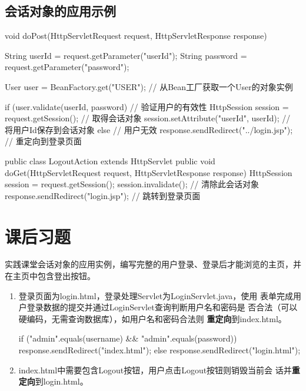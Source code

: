 \subsection{会话对象的应用示例} 


\begin{javaCode}
  void doPost(HttpServletRequest request, HttpServletResponse response) {
    String userId = request.getParameter("userId");
    String password = request.getParameter("password");

    User user = BeanFactory.get("USER"); // 从Bean工厂获取一个User的对象实例
    
    if (user.validate(userId, password) { // 验证用户的有效性
      HttpSession session = request.getSession();  // 取得会话对象
      session.setAttribute("userId", userId);  // 将用户Id保存到会话对象
    } else { // 用户无效
      response.sendRedirect("../login.jsp"); // 重定向到登录页面
    }
  }
\end{javaCode}



\begin{javaCode}
  public class LogoutAction extends HttpServlet {
    public void doGet(HttpServletRequest request, HttpServletResponse response) {
      HttpSession session = request.getSession();
      session.invalidate(); // 清除此会话对象
      response.sendRedirect("login.jsp"); // 跳转到登录页面
    }
  }
\end{javaCode}

\section{课后习题}
  

实践课堂会话对象的应用实例，编写完整的用户登录、登录后才能浏览的主页，并在主页中包含登出按钮。

\begin{enumerate}
\item 登录页面为login.html，登录处理Servlet为LoginServlet.java，使用
  表单完成用户登录数据的提交并通过LoginServlet查询判断用户名和密码是
  否合法（可以硬编码，无需查询数据库），如用户名和密码合法则{\bf\Red
    重定向}到index.html。
  \begin{javaCode}
    if ("admin".equals(username) && "admin".equals(password)) {
      response.sendRedirect("index.html");
    } else {
      response.sendRedirect("login.html");
    }
  \end{javaCode}
\item index.html中需要包含Logout按钮，用户点击Logout按钮则销毁当前会
  话并{\bf\Red 重定向}到login.html。
\end{enumerate}